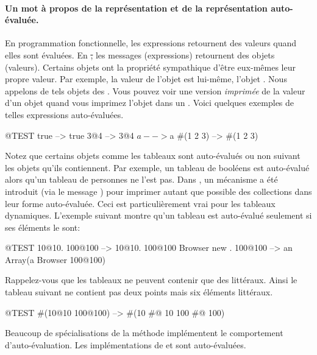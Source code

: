 \documentclass[a4paper,10pt,twoside]{book}
\begin{document}
\paragraph{Un mot \`a propos de la repr\'esentation et de la repr\'esentation auto-\'evalu\'ee.}
En programmation fonctionnelle, les expressions retournent des valeurs quand elles sont \'evalu\'ees. En \st, les messages (expressions) retournent des objets (valeurs). Certains objets ont la propri\'et\'e sympathique d'\^etre eux-m\^emes leur propre valeur. Par exemple, la valeur de l'objet  est lui-m\^eme, \ie l'objet . Nous appelons de tels objets des . Vous pouvez voir une version  \emph{imprim\'ee} de la valeur d'un objet quand vous imprimez l'objet dans un . Voici quelques exemples de telles expressions auto-\'evalu\'ees. 

\begin{code}{@TEST}
true     --> true
3@4      --> 3@4
$a       --> $a
#(1 2 3) --> #(1 2 3)
\end{code}

Notez que certains objets comme les tableaux sont auto-\'evalu\'es ou
non suivant les objets qu'ils contiennent. Par exemple, un tableau de
bool\'eens est auto-\'evalu\'e alors qu'un tableau de personnes ne
l'est pas. Dans , un m\'ecanisme a \'et\'e introduit (via le
message ) pour imprimer autant que
possible des collections dans leur forme auto-\'evalu\'ee. Ceci est particuli\`erement vrai pour les tableaux dynamiques. L'exemple suivant montre qu'un tableau  est auto-\'evalu\'e seulement si ses \'el\'ements le sont:
\begin{code}{@TEST}
{10@10. 100@100}          --> {10@10. 100@100}
{Browser new . 100@100}    --> an Array(a Browser 100@100)
\end{code}

Rappelez-vous que les tableaux  ne peuvent contenir que des litt\'eraux. Ainsi le tableau suivant ne contient pas deux points mais six \'el\'ements litt\'eraux.
\begin{code}{@TEST}
#(10@10 100@100) --> #(10 #@ 10 100 #@ 100)
\end{code}

Beaucoup de sp\'ecialisations de la m\'ethode  impl\'ementent le comportement d'auto-\'evaluation. Les impl\'ementations de  et  sont auto-\'evalu\'ees.
\end{document}
